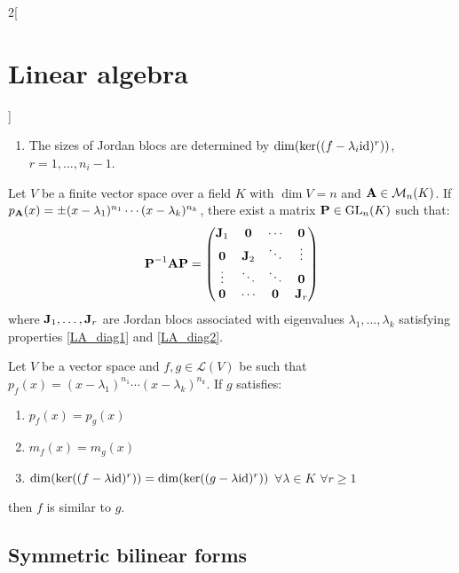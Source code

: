 \documentclass[../../../main.tex]{subfiles}
\begin{document}
\begin{multicols}{2}[\section{Linear algebra}]
\begin{prop}
\begin{enumerate}
            \item\label{LA_diag2} The sizes of Jordan blocs are determined by $\dim(\ker((f-\lambda_i\mathrm{id})^r))$, $r=1,\ldots,n_i-1$.
        \end{enumerate}
    \end{prop}
    \begin{prop}
        Let $V$ be a finite vector space over a field $K$ with $\dim V=n$ and $\boldsymbol{\mathrm{A}}\in\mathcal{M}_n(K)$. If $p_{\boldsymbol{\mathrm{A}}}(x)=\pm(x-\lambda_1)^{n_1}\cdots(x-\lambda_k)^{n_k}$, there exist a matrix $\boldsymbol{\mathrm{P}}\in\mathrm{GL}_n(K)$ such that:
        $$\boldsymbol{\mathrm{P}}^{-1}\boldsymbol{\mathrm{A}}\boldsymbol{\mathrm{P}}=
            \begin{pmatrix}
                \boldsymbol{\mathrm{J}}_1 & \boldsymbol{\mathrm{0}}   & \cdots             & \boldsymbol{\mathrm{0}}   \\
                \boldsymbol{\mathrm{0}}   & \boldsymbol{\mathrm{J}}_2 & \ddots             & \vdots               \\
                \vdots               & \ddots               & \ddots             & \boldsymbol{\mathrm{0}}   \\
                \boldsymbol{\mathrm{0}}   & \cdots               & \boldsymbol{\mathrm{0}} & \boldsymbol{\mathrm{J}}_r \\
            \end{pmatrix}
        $$
        where $\boldsymbol{\mathrm{J}}_1,\ldots,\boldsymbol{\mathrm{J}}_r$ are Jordan blocs associated with eigenvalues $\lambda_1,\ldots,\lambda_k$ satisfying properties \ref{LA_diag1} and \ref{LA_diag2}.
    \end{prop}
    \begin{theorem}
        Let $V$ be a vector space and $f,g\in\mathcal{L}(V)$ be such that $p_f(x)=(x-\lambda_1)^{n_1}\cdots(x-\lambda_k)^{n_k}$. If $g$ satisfies:
        \begin{enumerate}
            \item $p_f(x)=p_g(x)$
            \item $m_f(x)=m_g(x)$
            \item $\dim(\ker((f-\lambda \mathrm{id})^r))=\dim(\ker((g-\lambda \mathrm{id})^r))$ $\forall\lambda\in K$ $\forall r\geq 1$
        \end{enumerate}
        then $f$ is similar to $g$.
    \end{theorem}
    \subsection{Symmetric bilinear forms}

\end{multicols}
\end{document}
